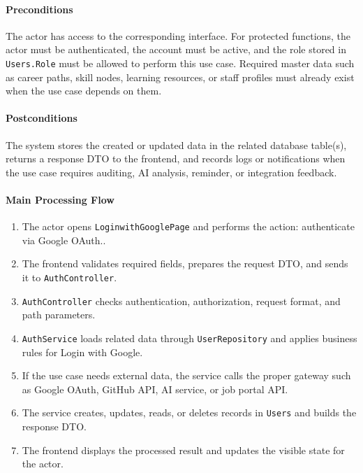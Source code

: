 \paragraph{Preconditions}

The actor has access to the corresponding interface. For protected functions, the actor must be authenticated, the account must be active, and the role stored in \texttt{Users.Role} must be allowed to perform this use case. Required master data such as career paths, skill nodes, learning resources, or staff profiles must already exist when the use case depends on them.

\paragraph{Postconditions}

The system stores the created or updated data in the related database table(s), returns a response DTO to the frontend, and records logs or notifications when the use case requires auditing, AI analysis, reminder, or integration feedback.

\paragraph{Main Processing Flow}

\begin{enumerate}
    \item The actor opens \texttt{LoginwithGooglePage} and performs the action: authenticate via Google OAuth..
    \item The frontend validates required fields, prepares the request DTO, and sends it to \texttt{AuthController}.
    \item \texttt{AuthController} checks authentication, authorization, request format, and path parameters.
    \item \texttt{AuthService} loads related data through \texttt{UserRepository} and applies business rules for Login with Google.
    \item If the use case needs external data, the service calls the proper gateway such as Google OAuth, GitHub API, AI service, or job portal API.
    \item The service creates, updates, reads, or deletes records in \texttt{Users} and builds the response DTO.
    \item The frontend displays the processed result and updates the visible state for the actor.
\end{enumerate}

